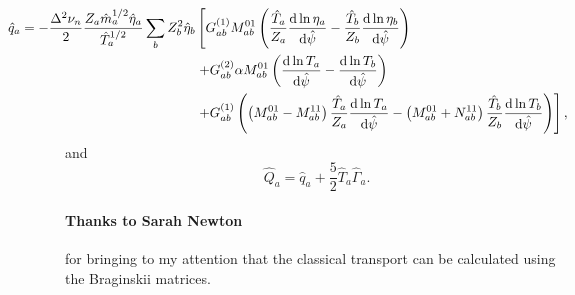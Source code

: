 \documentclass[12pt, a4paper]{article}
\renewcommand{\d}{\ensuremath{\mathrm{d}}}
\begin{document}
\begin{equation}
\begin{aligned}
  \hspace*{-10ex} \hat{q}_a =  -\frac{\Delta^2 \nu_n}{2} \frac{Z_a\hat{m}_a^{1/2} \hat{\eta}_a}{\hat{T}_a^{1/2}} \sum_b Z_b^2 \hat{\eta}_b &\left[
    G_{ab}^{(1)}  M_{ab}^{01}\left(\frac{\hat{T}_a}{Z_a}  \frac{\d \ln\eta_a}{\d \hat{\psi}} - \frac{\hat{T}_b}{Z_b}\frac{\d \ln\eta_b}{\d \hat{\psi}}\right) \right.\\
    &\left.+G_{ab}^{(2)} \alpha M_{ab}^{01} \left(\frac{\d \ln T_a}{\d \hat{\psi}}-\frac{\d \ln T_b}{\d \hat{\psi}}\right) \right.\\
    &\left.+ G_{ab}^{(1)} \left(\left(M_{ab}^{01} - M_{ab}^{11}\right)\frac{ \hat{T}_a}{Z_a} \frac{\d \ln T_a}{\d \hat{\psi}}
    - \left(M_{ab}^{01} + N_{ab}^{11}\right)\frac{\hat{T}_b}{Z_b}\frac{\d \ln T_b}{\d \hat{\psi}}\right) \right],
\end{aligned}
\end{equation}
and
\begin{equation}
\hat{Q}_a = \hat{q}_a + \frac{5}{2} \hat{T}_a \hat{\Gamma}_a. 
\end{equation}

\paragraph{Thanks to Sarah Newton} for bringing to my attention that the classical transport can be calculated using the Braginskii matrices. 
\end{document}
